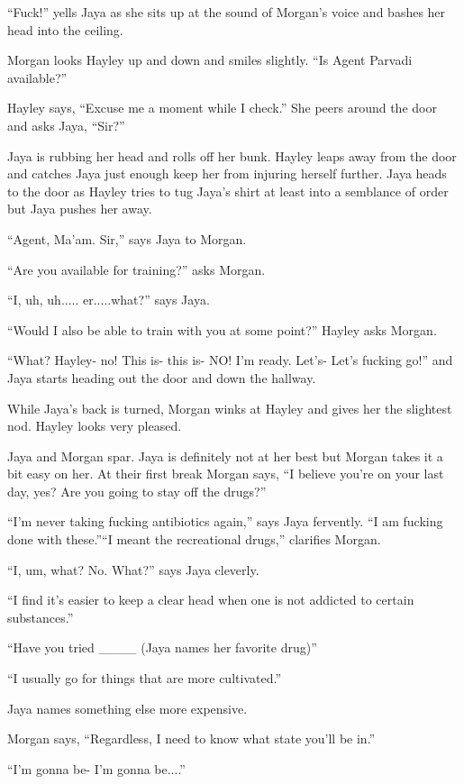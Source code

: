``Fuck!'' yells Jaya as she sits up at the sound of Morgan's voice and bashes her head into the ceiling.

Morgan looks Hayley up and down and smiles slightly.  ``Is Agent Parvadi available?''

Hayley says, ``Excuse me a moment while I check.''  She peers around the door and asks Jaya, ``Sir?''

Jaya is rubbing her head and rolls off her bunk.  Hayley leaps away from the door and catches Jaya just enough keep her from injuring herself further.  Jaya heads to the door as Hayley tries to tug Jaya's shirt at least into a semblance of order but Jaya pushes her away. 

``Agent, Ma'am. Sir,'' says Jaya to Morgan.

``Are you available for training?'' asks Morgan.

``I, uh, uh..... er.....what?'' says Jaya.

``Would I also be able to train with you at some point?'' Hayley asks Morgan.

``What?  Hayley- no!  This is- this is- NO!   I'm ready.  Let's- Let's fucking go!'' and Jaya starts heading out the door and down the hallway.

While Jaya's back is turned, Morgan winks at Hayley and gives her the slightest nod.  Hayley looks very pleased.



Jaya and Morgan spar.  Jaya is definitely not at her best but Morgan takes it a bit easy on her.  At their first break Morgan says, ``I believe you're on your last day, yes?  Are you going to stay off the drugs?''

``I'm never taking fucking antibiotics again,'' says Jaya fervently.  ``I am fucking done with these.''``I meant the recreational drugs,'' clarifies Morgan.

``I, um, what? No.  What?'' says Jaya cleverly.

``I find it's easier to keep a clear head when one is not addicted to certain substances.''

``Have you tried \_\_\_\_ (Jaya names her favorite drug)''

``I usually go for things that are more cultivated.''

Jaya names something else more expensive.

Morgan says, ``Regardless, I need to know what state you'll be in.''

``I'm gonna be- I'm gonna be....''

